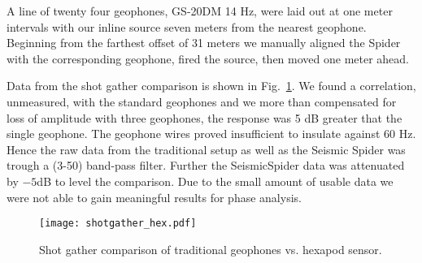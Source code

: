 A line of twenty four geophones, GS-20DM 14 Hz, were laid out at one meter intervals with our inline source seven meters from the nearest geophone. Beginning from the farthest offset of 31 meters we manually aligned the Spider with the corresponding geophone, fired the source, then moved one meter ahead. 

Data from the shot gather comparison is shown in Fig.~\ref{fig:shotgatherHexpod}.
We found a correlation, unmeasured, with the standard geophones and we more than compensated for loss of amplitude with three geophones, the response was 5 dB greater that the single geophone. The geophone wires proved insufficient to insulate against 60 Hz. Hence the raw data from the traditional setup as well as the Seismic Spider was trough a (3-50) band-pass filter. Further the SeismicSpider data was attenuated by $-5$dB to level the comparison.  Due to the small amount of usable data we were not able to gain meaningful results for phase analysis.   

\begin{figure} \centering
  {\texttt{[image: shotgather\_hex.pdf]}}
 \caption{Shot gather comparison of traditional geophones vs. hexapod sensor. 
 \label{fig:shotgatherHexpod}}
\end{figure}


